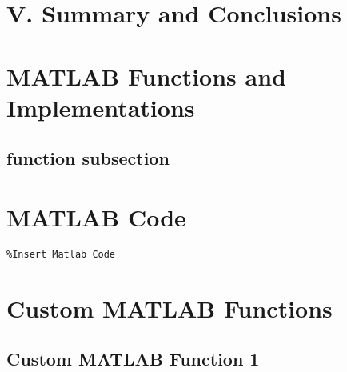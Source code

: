 \documentclass[11pt]{article}
\begin{document}
\section*{V.	Summary and Conclusions}
\pagebreak

\begin{appendices}

\section{MATLAB Functions and Implementations}

\subsection*{function subsection}

\section{MATLAB Code}
\begin{verbatim}
%Insert Matlab Code 

\end{verbatim}

\section{Custom MATLAB Functions}

\subsection*{Custom MATLAB Function 1}


\end{appendices}
\end{document}
